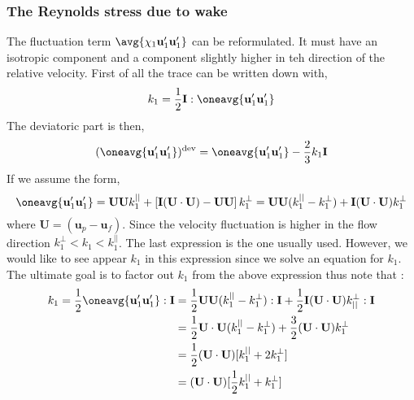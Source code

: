 \subsubsection{The Reynolds stress due to wake}
The fluctuation term $\avg{\chi_1 \textbf{u}_1'\textbf{u}_1'}$ can be reformulated. 
It must have an isotropic component and a component slightly higher in teh direction of the relative velocity.  
First of all the trace can be written down with, 
\begin{equation*}
    k_1=
    \frac{1}{2}\textbf{I}:\oneavg{\textbf{u}_1'\textbf{u}_1'}
\end{equation*}
The deviatoric part is then, 
\begin{equation*}
    (\oneavg{\textbf{u}_1'\textbf{u}_1'})^\text{dev}=
    \oneavg{\textbf{u}_1'\textbf{u}_1'}
    - \frac{2}{3}k_1\textbf{I}
\end{equation*}
If we assume the form, 
\begin{equation*}
    \oneavg{\textbf{u}_1'\textbf{u}_1'}
    = 
    \textbf{U}
    \textbf{U}
    k^{||}_1
    + 
    \left[
        \textbf{I} (\textbf{U}\cdot \textbf{U})
    -
    \textbf{U}
    \textbf{U}
    \right]
    k^{\bot}_1
    = 
    \textbf{U}
    \textbf{U}
    (k^{||}_1 - k^{\bot}_1)
    + \textbf{I} (\textbf{U}\cdot\textbf{U}) k^\bot_1
\end{equation*}
where $\textbf{U} = (\textbf{u}_p - \textbf{u}_f)$. 
Since the velocity fluctuation is higher in the flow direction $k^\bot_1 < k_1 < k^{||}_1$. 
The last expression is the one usually used. 
However, we would like to see appear $k_1$ in this expression since we solve an equation for $k_1$.  
The ultimate goal is to factor out $k_1$ from the above expression thus note that :
\begin{align*}
    k_1 =
    \frac{1}{2} \oneavg{\textbf{u}_1'\textbf{u}_1'} : \textbf{I}
    &= 
    \frac{1}{2} \textbf{U}
    \textbf{U}
    (k^{||}_1 - k^{\bot}_1) : \textbf{I}
    + \frac{1}{2} \textbf{I} (\textbf{U}\cdot\textbf{U}) k^\bot_{||} : \textbf{I}\\
    &= 
    \frac{1}{2} 
    \textbf{U}\cdot 
    \textbf{U}
    (k^{||}_1 - k^{\bot}_1)
    + \frac{3}{2}  (\textbf{U}\cdot\textbf{U}) k^\bot_1 \\
    &= 
    \frac{1}{2} 
    (\textbf{U}\cdot 
    \textbf{U})[
        k^{||}_1 
        + 2 k^\bot_1
    ]\\
    &= 
    (\textbf{U}\cdot 
    \textbf{U})[
        \frac{1}{2}k^{||}_1 
        + k^\bot_1
    ]
\end{align*}
